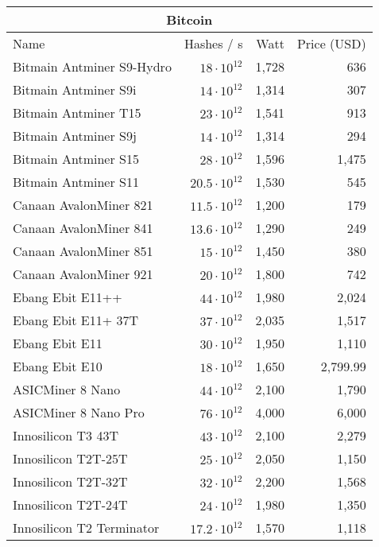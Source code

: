 \begin{longtable}{|p{}|r|r|r|}
  \hline
  \multicolumn{4}{|c|}{\textbf{Bitcoin}} \\
  \hline
  Name & Hashes / s & Watt & Price (USD) \\
  \hhline{|=|=|=|=|}
  Bitmain Antminer S9-Hydro &    $18 \cdot 10^{12}$ & 1,728 & 636 \\
  Bitmain Antminer S9i &         $14 \cdot 10^{12}$ & 1,314 & 307 \\
  Bitmain Antminer T15 &         $23 \cdot 10^{12}$ & 1,541 & 913 \\
  Bitmain Antminer S9j &         $14 \cdot 10^{12}$ & 1,314 & 294 \\
  Bitmain Antminer S15 &         $28 \cdot 10^{12}$ & 1,596 & 1,475 \\
  Bitmain Antminer S11 &         $20.5 \cdot 10^{12}$ & 1,530 & 545 \\
  Canaan AvalonMiner 821 &       $11.5 \cdot 10^{12}$ & 1,200 & 179 \\
  Canaan AvalonMiner 841 &       $13.6 \cdot 10^{12}$ & 1,290 & 249 \\
  Canaan AvalonMiner 851 &       $15 \cdot 10^{12}$ & 1,450 & 380 \\
  Canaan AvalonMiner 921 &       $20 \cdot 10^{12}$ & 1,800 & 742 \\
  Ebang Ebit E11++ &             $44 \cdot 10^{12}$ & 1,980 & 2,024 \\
  Ebang Ebit E11+ 37T &          $37 \cdot 10^{12}$ & 2,035 & 1,517 \\
  Ebang Ebit E11 &               $30 \cdot 10^{12}$ & 1,950 & 1,110 \\
  Ebang Ebit E10 &               $18 \cdot 10^{12}$ & 1,650 & 2,799.99 \\
  ASICMiner 8 Nano &             $44 \cdot 10^{12}$ & 2,100 & 1,790 \\
  ASICMiner 8 Nano Pro &         $76 \cdot 10^{12}$ & 4,000 & 6,000 \\
  Innosilicon T3 43T &           $43 \cdot 10^{12}$ & 2,100 & 2,279 \\
  Innosilicon T2T-25T &          $25 \cdot 10^{12}$ & 2,050 & 1,150 \\
  Innosilicon T2T-32T &          $32 \cdot 10^{12}$ & 2,200 & 1,568 \\
  Innosilicon T2T-24T &          $24 \cdot 10^{12}$ & 1,980 & 1,350 \\
  Innosilicon T2 Terminator &    $17.2 \cdot 10^{12}$ & 1,570 & 1,118 \\

\end{longtable}
